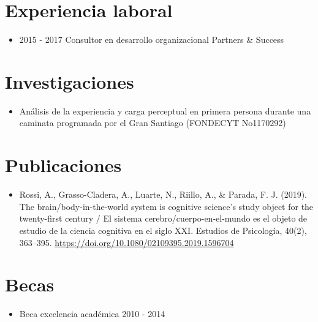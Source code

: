 \documentclass[11pt]{article}
\begin{document}
\section*{Experiencia laboral}
\label{sec:orgfb34ecb}
\begin{itemize}
\item 2015 - 2017 Consultor en desarrollo organizacional Partners \& Success
\end{itemize}
\section*{Investigaciones}
\label{sec:org2288438}
\begin{itemize}
\item Análisis de la experiencia y carga perceptual en primera persona durante una caminata programada por el Gran Santiago (FONDECYT No1170292)
\end{itemize}
\section*{Publicaciones}
\label{sec:org15e9787}
\begin{itemize}
\item Rossi, A., Grasso-Cladera, A., Luarte, N., Riillo, A., \& Parada, F. J. (2019). The brain/body-in-the-world system is cognitive science’s study object for the twenty-first century / El sistema cerebro/cuerpo-en-el-mundo es el objeto de estudio de la ciencia cognitiva en el siglo XXI. Estudios de Psicología, 40(2), 363–395. \url{https://doi.org/10.1080/02109395.2019.1596704}
\end{itemize}
\section*{Becas}
\label{sec:org36d172e}
\begin{itemize}
\item Beca excelencia académica 2010 - 2014
\end{itemize}
\end{document}
